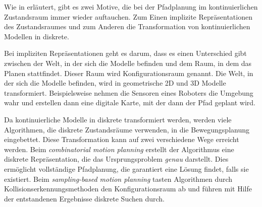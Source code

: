 Wie in \cite[~S. 79 f.]{Lav06} erläutert, gibt es zwei Motive, die bei der Pfadplanung im kontinuierlichen Zustandsraum immer wieder auftauchen. Zum Einen implizite Repräsentationen des Zustandsraumes und zum Anderen die Transformation von kontinuierlichen Modellen in diskrete.

Bei impliziten Repräsentationen geht es darum, dass es einen Unterschied gibt zwischen der Welt, in der sich die Modelle befinden und dem Raum, in dem das Planen stattfindet. Dieser Raum wird Konfigurationsraum genannt. Die Welt, in der sich die Modelle befinden, wird in geometrische 2D und 3D Modelle transformiert. Beispielsweise nehmen die Sensoren eines Roboters die Umgebung wahr und erstellen dann eine digitale Karte, mit der dann der Pfad geplant wird.

Da kontinuierliche Modelle in diskrete transformiert werden, werden viele Algorithmen, die diskrete Zustandsräume verwenden, in die Bewegungsplanung eingebettet. Diese Transformation kann auf zwei verschiedene Wege erreicht werden. Beim \textit{combinatorial motion planning} erstellt der Algorithmus eine diskrete Repräsentation, die das Ursprungsproblem \textit{genau} darstellt. Dies ermöglicht vollständige Pfadplanung, die garantiert eine Lösung findet, falls sie existiert. Beim \textit{sampling-based motion planning} tasten Algorithmen durch Kollisionserkennungsmethoden den Konfigurationsraum ab und führen mit Hilfe der entstandenen Ergebnisse diskrete Suchen durch.


%
%

